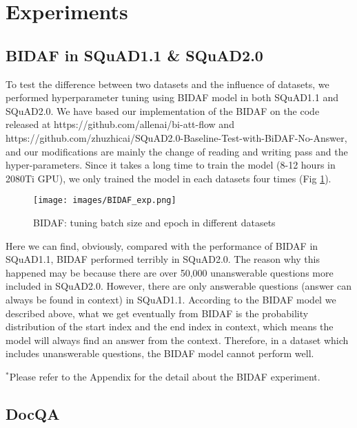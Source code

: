 \documentclass{article}
\begin{document}
\section{Experiments}

\subsection{BIDAF in SQuAD1.1 \& SQuAD2.0}
    To test the difference between two datasets and the influence of datasets, we performed hyperparameter tuning using BIDAF model in both SQuAD1.1 and SQuAD2.0. We have based our implementation of the BIDAF on the code released at https://github.com/allenai/bi-att-flow and https://github.com/zhuzhicai/SQuAD2.0-Baseline-Test-with-BiDAF-No-Answer, and our modifications are mainly the change of reading and writing pass and the hyper-parameters. Since it takes a long time to train the model (8-12 hours in 2080Ti GPU), we only trained the model in each datasets four times (Fig \ref{fig:bidafexper}).
    
    \begin{figure}[h]
      \texttt{[image: images/BIDAF\_exp.png]}
      \centering
      \caption{BIDAF: tuning batch size and epoch in different datasets}
      \label{fig:bidafexper}
    \end{figure}
    
    Here we can find, obviously, compared with the performance of BIDAF in SQuAD1.1, BIDAF performed terribly in SQuAD2.0. The reason why this happened may be because there are over 50,000 unanswerable questions more included in SQuAD2.0. However, there are only answerable questions (answer can always be found in context) in SQuAD1.1. According to the BIDAF model we described above, what we get eventually from BIDAF is the probability distribution of the start index and the end index in context, which means the model will always find an answer from the context. Therefore, in a dataset which includes unanswerable questions, the BIDAF model cannot perform well. 
    
    $^\ast$Please refer to the Appendix for the detail about the BIDAF experiment.

\subsection{DocQA}
\end{document}
